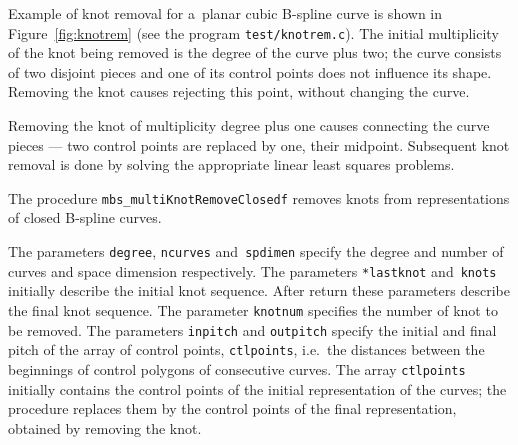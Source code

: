 Example of knot removal for a~planar cubic B-spline curve is shown in
Figure~\ref{fig:knotrem} (see the program \texttt{test/knotrem.c}).
The initial multiplicity of the knot being removed is the degree of the curve
plus two; the curve consists of two disjoint pieces and one of its
control points does not influence its shape. Removing the knot causes
rejecting this point, without changing the curve.

Removing the knot of multiplicity degree plus one causes connecting the
curve pieces --- two control points are replaced by one, their midpoint.
Subsequent knot removal is done by solving the appropriate linear least
squares problems.

\vspace{\bigskipamount}
\begin{sloppypar}
The procedure \texttt{mbs\_multiKnotRemoveClosedf} removes knots from
representations of closed B-spline curves.
\end{sloppypar}

The parameters \texttt{degree}, \texttt{ncurves} and~\texttt{spdimen} specify
the degree and number of curves and space dimension respectively.
The parameters \texttt{*lastknot} and~\texttt{knots} initially describe
the initial knot sequence. After return these parameters describe the final
knot sequence.
The parameter \texttt{knotnum} specifies the number of knot to be removed.
The parameters \texttt{inpitch} and \texttt{outpitch} specify the initial and
final pitch of the array of control points,
\texttt{ctlpoints}, i.e.\ the distances between the beginnings
of control polygons of consecutive curves. The array \texttt{ctlpoints}
initially contains the control points of the initial representation of the
curves; the procedure replaces them by the control points of the final
representation, obtained by removing the knot.

